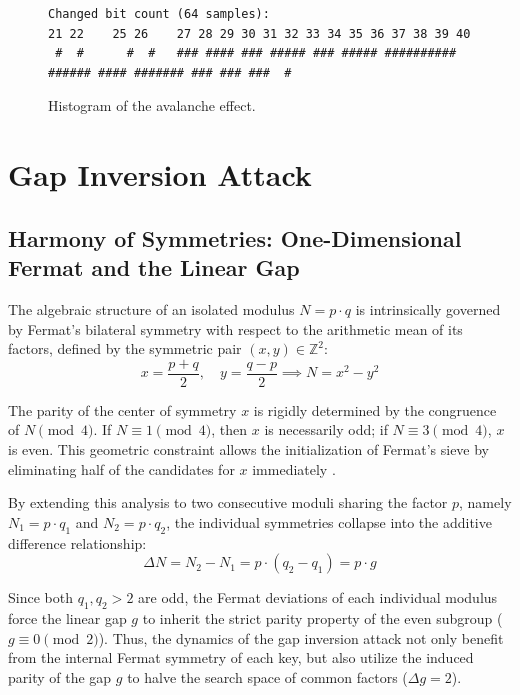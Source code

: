 \documentclass[12pt,a4paper]{article}
\theoremstyle{plain}
\begin{document}
\begin{figure}[htbp]
\centering
\begin{minipage}{0.7\textwidth}
\centering
\vspace{0.5cm}
{\footnotesize
\begin{verbatim}
Changed bit count (64 samples):
21 22    25 26    27 28 29 30 31 32 33 34 35 36 37 38 39 40
 #  #      #  #   ### #### ### ##### ### ##### ########## ###### #### ####### ### ### ###  #
\end{verbatim}
}
\caption{Histogram of the avalanche effect.}
\label{fig:hist_avalanche}
\end{minipage}
\end{figure}

\section{Gap Inversion Attack}
\label{sec:gap_inversion}

\subsection{Harmony of Symmetries: One-Dimensional Fermat and the Linear Gap}

The algebraic structure of an isolated modulus $N = p \cdot q$ is
intrinsically governed by Fermat's bilateral symmetry with respect to
the arithmetic mean of its factors, defined by the symmetric pair
$(x, y) \in \mathbb{Z}^2$:
\[
x = \frac{p+q}{2}, \quad
y = \frac{q-p}{2} \implies
N = x^2 - y^2
\]

The parity of the center of symmetry $x$ is rigidly determined by the
congruence of $N \pmod 4$. If $N \equiv 1 \pmod 4$, then $x$ is
necessarily odd; if $N \equiv 3 \pmod 4$, $x$ is even. This geometric
constraint allows the initialization of Fermat's sieve by eliminating
half of the candidates for $x$ immediately \cite{riesel1994}.

By extending this analysis to two consecutive moduli sharing the
factor $p$, namely $N_1 = p \cdot q_1$ and $N_2 = p \cdot q_2$, the
individual symmetries collapse into the additive difference relationship:
\[
\Delta N = N_2 - N_1 = p \cdot (q_2 - q_1) = p \cdot g
\]

Since both $q_1, q_2 > 2$ are odd, the Fermat deviations of each
individual modulus force the linear gap $g$ to inherit the strict
parity property of the even subgroup ($g \equiv 0 \pmod 2$). Thus, the
dynamics of the gap inversion attack not only benefit from the
internal Fermat symmetry of each key, but also utilize the induced
parity of the gap $g$ to halve the search space of common factors
($\Delta g = 2$).
\end{document}
